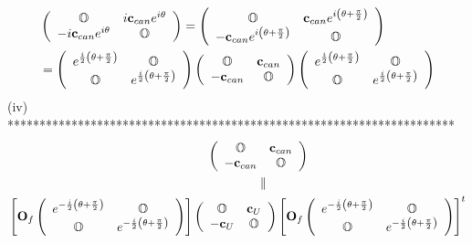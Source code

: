 \documentclass[aps,preprint]{revtex4}%
\begin{document}
\begin{align}
&  \left(
\begin{array}
[c]{cc}%
\mathbb{O} & i\mathbf{c}_{can}e^{i\mathbf{\theta}}\\
-i\mathbf{c}_{can}e^{i\mathbf{\theta}} & \mathbb{O}%
\end{array}
\right)  =\left(
\begin{array}
[c]{cc}%
\mathbb{O} & \mathbf{c}_{can}e^{i\left(  \mathbf{\theta+}\frac{\pi}{2}\right)
}\\
-\mathbf{c}_{can}e^{i\left(  \mathbf{\theta+}\frac{\pi}{2}\right)  } &
\mathbb{O}%
\end{array}
\right) \\
&  =\left(
\begin{array}
[c]{cc}%
e^{\frac{i}{2}\left(  \mathbf{\theta+}\frac{\pi}{2}\right)  } & \mathbb{O}\\
\mathbb{O} & e^{\frac{i}{2}\left(  \mathbf{\theta+}\frac{\pi}{2}\right)  }%
\end{array}
\right)  \left(
\begin{array}
[c]{cc}%
\mathbb{O} & \mathbf{c}_{can}\\
-\mathbf{c}_{can} & \mathbb{O}%
\end{array}
\right)  \left(
\begin{array}
[c]{cc}%
e^{\frac{i}{2}\left(  \mathbf{\theta+}\frac{\pi}{2}\right)  } & \mathbb{O}\\
\mathbb{O} & e^{\frac{i}{2}\left(  \mathbf{\theta+}\frac{\pi}{2}\right)  }%
\end{array}
\right)
\end{align}
(iv) **********************************************************************%
\begin{align*}
&  \qquad\qquad\qquad\qquad\qquad\qquad\qquad\qquad\left(
\begin{array}
[c]{cc}%
\mathbb{O} & \mathbf{c}_{can}\\
-\mathbf{c}_{can} & \mathbb{O}%
\end{array}
\right) \\
&  \qquad\qquad\qquad\qquad\qquad\qquad\qquad\qquad\qquad\qquad\left.
\parallel\right. \\
&  \left[  \mathbf{O}_{f}\left(
\begin{array}
[c]{cc}%
e^{-\frac{i}{2}\left(  \mathbf{\theta+}\frac{\pi}{2}\right)  } & \mathbb{O}\\
\mathbb{O} & e^{-\frac{i}{2}\left(  \mathbf{\theta+}\frac{\pi}{2}\right)  }%
\end{array}
\right)  \right]  \left(
\begin{array}
[c]{cc}%
\mathbb{O} & \mathbf{c}_{U}\\
-\mathbf{c}_{U} & \mathbb{O}%
\end{array}
\right)  \left[  \mathbf{O}_{f}\left(
\begin{array}
[c]{cc}%
e^{-\frac{i}{2}\left(  \mathbf{\theta+}\frac{\pi}{2}\right)  } & \mathbb{O}\\
\mathbb{O} & e^{-\frac{i}{2}\left(  \mathbf{\theta+}\frac{\pi}{2}\right)  }%
\end{array}
\right)  \right]  ^{t}%
\end{align*}
\end{document}
